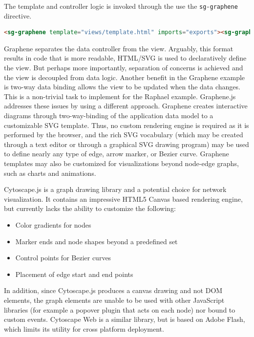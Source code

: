 The template and controller logic is invoked through the use the \texttt{sg-graphene} directive.

\begin{lstlisting}[language=html]
<sg-graphene template="views/template.html" imports="exports"><sg-graphene>
\end{lstlisting}

Graphene separates the data controller from the view.
Arguably, this format results in code that is more readable, HTML/SVG is used to declaratively define the view.
But perhaps more importantly, separation of concerns is achieved and the view is decoupled from data logic.
Another benefit in the Graphene example is two-way data binding allows the view to be updated when the data changes.
This is a non-trivial task to implement for the Raphael example.
Graphene.js addresses these issues by using a different approach.
Graphene creates interactive diagrams through two-way-binding of the application data model to a customizable SVG template.
Thus, no custom rendering engine is required as it is performed by the browser, and the rich SVG vocabulary (which may be created through a text editor or through a graphical SVG drawing program) may be used to define nearly any type of edge, arrow marker, or Bezier curve.
Graphene templates may also be customized for visualizations beyond node-edge graphs, such as charts and animations.

Cytoscape.js \autocite{cytoscape2014js} is a graph drawing library and a potential choice for network visualization. 
It contains an impressive HTML5 Canvas based rendering engine, but currently lacks the ability to customize the following:

\begin{itemize}
\item Color gradients for nodes
\item Marker ends and node shapes beyond a predefined set
\item Control points for Bezier curves
\item Placement of edge start and end points
\end{itemize}

In addition, since Cytoscape.js produces a canvas drawing and not DOM elements, the graph elements are unable to be used with other JavaScript libraries (for example a popover plugin that acts on each node) nor bound to custom events.
Cytoscape Web \autocite{cytoscape2014web} is a similar library, but is based on Adobe Flash, which limits its utility for cross platform deployment.



